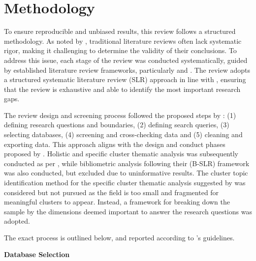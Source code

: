\section{Methodology}
\label{sec:methodology}

To ensure reproducible and unbiased results, this review follows a structured methodology. As noted by \textcite{tranfield_et_al}, traditional literature reviews often lack systematic rigor, making it challenging to determine the validity of their conclusions. To address this issue, each stage of the review was conducted systematically, guided by established literature review frameworks, particularly \textcite{snyder_2019} and \textcite{marzi_et_al_2024}. The review adopts a structured systematic literature review (SLR) approach in line with \textcite{snyder_2019}, ensuring that the review is exhaustive and able to identify the most important research gaps. 

The review design and screening process followed the proposed steps by \textcite{marzi_et_al_2024}: (1) defining research questions and boundaries, (2) defining search queries, (3) selecting databases, (4) screening and cross-checking data and (5) cleaning and exporting data. This approach aligns with the design and conduct phases proposed by \textcite{snyder_2019}. Holistic and specific cluster thematic analysis was subsequently conducted as per \textcite{marzi_et_al_2024}, while bibliometric analysis following their (B-SLR) framework was also conducted, but excluded due to uninformative results. The cluster topic identification method for the specific cluster thematic analysis suggested by \cite{marzi_et_al_2024} was considered but not pursued as the field is too small and fragmented for meaningful clusters to appear. Instead, a framework for breaking down the sample by the dimensions deemed important to answer the research questions was adopted. 

The exact process is outlined below, and reported according to \textcite{marzi_et_al_2024}'s guidelines.

\textbf{Database Selection}\nopagebreak

